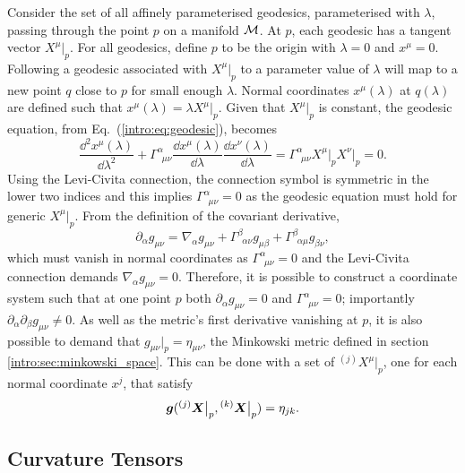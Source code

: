 Consider the set of all affinely parameterised geodesics, parameterised with $\lambda$, passing through the point $p$ on a manifold $\mathcal{M}$. At $p$, each geodesic has a tangent vector $X^\mu\big|_p$. For all geodesics, define $p$ to be the origin with $\lambda=0$ and $x^\mu=0$. Following a geodesic associated with $X^\mu\big|_p$ to a parameter value of $\lambda$ will map to a new point $q$ close to $p$ for small enough $\lambda$. Normal coordinates $x^\mu(\lambda)$ at $q(\lambda)$ are defined such that $x^\mu(\lambda) = \lambda X^\mu\big|_p$. Given that $X^\mu\big|_p$ is constant, the geodesic equation, from Eq.~(\ref{intro:eq:geodesic}), becomes 
\begin{equation}
\frac{\dd ^2 x^\mu(\lambda)}{\dd \lambda^2} +  \Gamma^\alpha_{\,\,\,\mu\nu} \frac{\dd x^\mu(\lambda)}{\dd \lambda}  \frac{\dd x^\nu(\lambda)}{\dd \lambda} = \Gamma^\alpha_{\,\,\,\mu\nu}X^\mu\big|_p  X^\nu\big|_p =0.
\end{equation}
Using the Levi-Civita connection, the connection symbol is symmetric in the lower two indices and this implies $\Gamma^\alpha_{\,\,\,\mu\nu}=0$ as the geodesic equation must hold for generic $X^\mu\big|_p$. From the definition of the covariant derivative, 
\begin{equation}
\partial_\alpha g_{\mu\nu} = \nabla_\alpha g_{\mu\nu} + \Gamma^{\beta}_{\,\,\,\alpha\nu}g_{\mu\beta} + \Gamma^{\beta}_{\,\,\,\alpha\mu}g_{\beta \nu},
\end{equation}
which must vanish in normal coordinates as $\Gamma^\alpha_{\,\,\,\mu\nu}=0$ and the Levi-Civita connection demands $\nabla_\alpha g_{\mu\nu}=0$. Therefore, it is possible to construct a coordinate system such that at one point $p$ both $\partial_\alpha g_{\mu\nu}=0$ and $\Gamma^\alpha_{\,\,\,\mu\nu}=0$; importantly $\partial_\alpha \partial_\beta g_{\mu\nu}\neq 0$. As well as the metric's first derivative vanishing at $p$, it is also possible to demand that $g_{\mu\nu}\big|_p = \eta_{\mu\nu}$, the Minkowski metric defined in section \ref{intro:sec:minkowski_space}. This can be done with a set of ${}^{(j)}X^\mu \big|_p$, one for each normal coordinate $x^j$, that satisfy 
\begin{equation} \boldsymbol{g}({}^{(j)}\boldsymbol{X}\big|_p , {}^{(k)}\boldsymbol{X}\big|_p) = \eta_{jk}. \end{equation}







\subsection{Curvature Tensors}\label{intro:sec:curvature}

